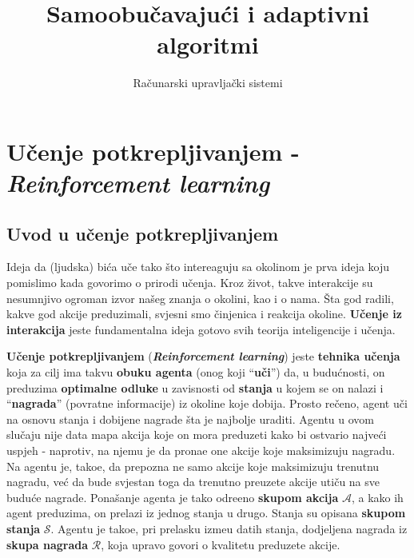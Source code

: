 \documentclass[12pt]{IEEEtran}
\title{Samoobu\v{c}avaju\'{c}i i adaptivni algoritmi}
\author{Ra\v{c}unarski upravlja\v{c}ki sistemi}
\numberwithin{equation}{subsection}
\numberwithin{figure}{subsection}
\theoremstyle{definition}
\numberwithin{example}{section}
\begin{document}
\maketitle

\tableofcontents

\newpage
\section{\textbf{U\v{c}enje potkrepljivanjem - \textit{Reinforcement learning}}}

\subsection{\textbf{Uvod u u\v{c}enje potkrepljivanjem}}

Ideja da (ljudska) bi\'{c}a u\v{c}e tako \v{s}to intereaguju sa
okolinom je prva ideja koju pomislimo kada govorimo o prirodi
u\v{c}enja. Kroz \v{z}ivot, takve interakcije su nesumnjivo
ogroman izvor na\v{s}eg znanja o okolini, kao i o nama.
\v{S}ta god radili, kakve god akcije preduzimali,
svjesni smo \v{c}injenica i reakcija okoline. \textbf{U\v{c}enje
    iz interakcija} jeste fundamentalna ideja gotovo svih teorija
inteligencije i u\v{c}enja.

\textbf{U\v{c}enje potkrepljivanjem} (\textbf{\textit{Reinforcement learning}})
jeste \textbf{tehnika u\v{c}enja} koja za cilj ima takvu \textbf{obuku agenta}
(onog koji \enquote{\textbf{u\v{c}i}}) da, u budu\'{c}nosti,
on preduzima \textbf{optimalne odluke} u zavisnosti od \textbf{stanja} u kojem se on nalazi
i \enquote{\textbf{nagrada}} (povratne informacije) iz okoline koje dobija.
Prosto re\v{c}eno, agent u\v{c}i na osnovu stanja i dobijene nagrade
\v{s}ta je najbolje uraditi.
Agentu u ovom slu\v{c}aju nije data mapa akcija koje on mora preduzeti kako bi ostvario
najve\'{c}i uspjeh - naprotiv, na njemu je
da prona\dj{}e one akcije koje maksimizuju nagradu. Na agentu je, tako\dj{}e, da prepozna
ne samo akcije koje maksimizuju trenutnu nagradu, ve\'{c} da bude svjestan toga
da trenutno preuzete akcije uti\v{c}u na sve budu\'{c}e nagrade.
Pona\v{s}anje agenta je tako odre\dj{}eno \textbf{skupom akcija} $\mathcal{A}$, a kako
ih agent preduzima, on prelazi iz jednog stanja u drugo. Stanja su opisana
\textbf{skupom stanja} $\mathcal{S}$. Agentu je tako\dj{}e, pri prelasku izme\dj{}u
datih stanja, dodjeljena nagrada iz \textbf{skupa nagrada} $\mathcal{R}$,
koja upravo govori o kvalitetu preduzete akcije.
\end{document}
